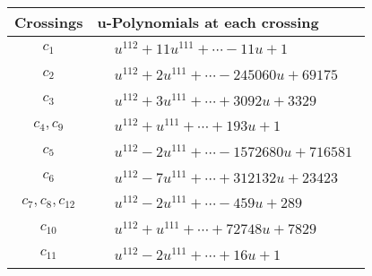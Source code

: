 \documentclass[1p]{elsarticle_modified}
\theoremstyle{definition}
\begin{document}
\begin{tabular}{m{50pt}|m{274pt}}
Crossings & \hspace{64pt}u-Polynomials at each crossing \\
\hline $$\begin{aligned}c_{1}\end{aligned}$$&$\begin{aligned}
&u^{112}+11 u^{111}+\cdots-11 u+1
\end{aligned}$\\
\hline $$\begin{aligned}c_{2}\end{aligned}$$&$\begin{aligned}
&u^{112}+2 u^{111}+\cdots-245060 u+69175
\end{aligned}$\\
\hline $$\begin{aligned}c_{3}\end{aligned}$$&$\begin{aligned}
&u^{112}+3 u^{111}+\cdots+3092 u+3329
\end{aligned}$\\
\hline $$\begin{aligned}c_{4},c_{9}\end{aligned}$$&$\begin{aligned}
&u^{112}+u^{111}+\cdots+193 u+1
\end{aligned}$\\
\hline $$\begin{aligned}c_{5}\end{aligned}$$&$\begin{aligned}
&u^{112}-2 u^{111}+\cdots-1572680 u+716581
\end{aligned}$\\
\hline $$\begin{aligned}c_{6}\end{aligned}$$&$\begin{aligned}
&u^{112}-7 u^{111}+\cdots+312132 u+23423
\end{aligned}$\\
\hline $$\begin{aligned}c_{7},c_{8},c_{12}\end{aligned}$$&$\begin{aligned}
&u^{112}-2 u^{111}+\cdots-459 u+289
\end{aligned}$\\
\hline $$\begin{aligned}c_{10}\end{aligned}$$&$\begin{aligned}
&u^{112}+u^{111}+\cdots+72748 u+7829
\end{aligned}$\\
\hline $$\begin{aligned}c_{11}\end{aligned}$$&$\begin{aligned}
&u^{112}-2 u^{111}+\cdots+16 u+1
\end{aligned}$\\
\hline
\end{tabular}\\~\\
\end{document}
